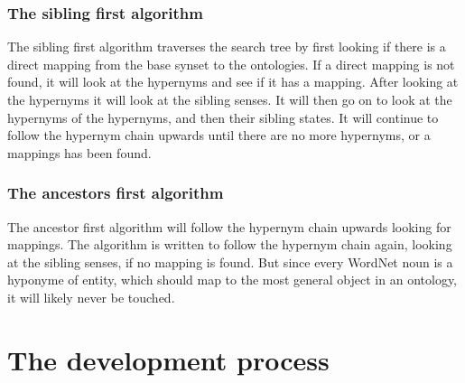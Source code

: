\subsubsection{The sibling first algorithm}
The sibling first algorithm traverses the search tree by first looking if there is a direct mapping from the base synset to the ontologies.
If a direct mapping is not found, it will look at the hypernyms and see if it has a mapping.
After looking at the hypernyms it will look at the sibling senses.
It will then go on to look at the hypernyms of the hypernyms, and then their sibling states.
It will continue to follow the hypernym chain upwards until there are no more hypernyms, or a mappings has been found.

\subsubsection{The ancestors first algorithm}
The ancestor first algorithm will follow the hypernym chain upwards looking for mappings.
The algorithm is written to follow the hypernym chain again, looking at the sibling senses, if no mapping is found.
But since every WordNet noun is a hyponyme of {entity}, which should map to the most general object in an ontology,
it will likely never be touched.



\section{The development process}

